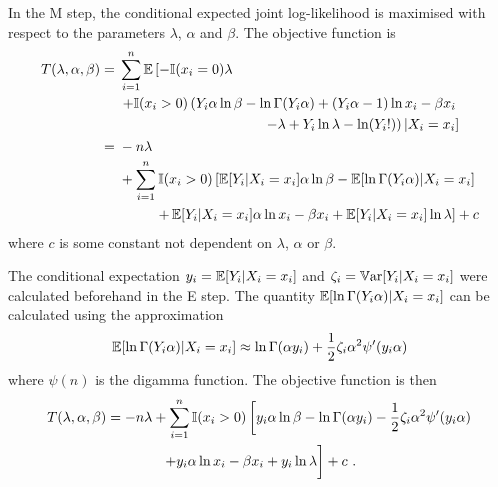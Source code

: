 In the M step, the conditional expected joint log-likelihood is maximised with respect to the parameters $\lambda$, $\alpha$ and $\beta$. The objective function is
\begin{align}
  T(\lambda,\alpha,\beta)&=
  \begin{multlined}[t]
    \sum_{i=1}^n
    \expectation\left[
      -\mathbb{I}(x_i=0)
      \lambda
    \right.
    \\
    \left.+
      \mathbb{I}(x_i>0)
      \left(
        Y_i\alpha\ln\beta-\ln\Gamma(Y_i\alpha)+(Y_i\alpha-1)\ln x_i - \beta x_i
      \right.
    \right.
    \\
    \left.
      \left.  
        - \lambda + Y_i \ln \lambda - \ln(Y_i!)
      \right)
      |X_i=x_i
    \right]
  \end{multlined}
  \nonumber\\
  &=\begin{multlined}[t]
    -n\lambda
    \\
    +\sum_{i=1}^n
    \mathbb{I}(x_i>0)
    \left[
      \expectation[Y_i|X_i=x_i]\alpha\ln\beta-\expectation[\ln\Gamma(Y_i\alpha)|X_i=x_i]
    \right.
    {}\\
    \left.
      +\expectation[Y_i|X_i=x_i]\alpha\ln x_i - \beta x_i
      + \expectation[Y_i|X_i=x_i] \ln \lambda
    \right] + c
  \end{multlined}
\end{align}
where $c$ is some constant not dependent on $\lambda$, $\alpha$ or $\beta$.

The conditional expectation $y_i = \operatorname{\mathbb{E}}[Y_i|X_i=x_i]$ and $\zeta_i = \operatorname{\mathbb{V}ar}[Y_i|X_i=x_i]$ were calculated beforehand in the E step. The quantity $\operatorname{\mathbb{E}}[\ln\Gamma(Y_i\alpha)|X_i=x_i]$ can be calculated using the approximation
\begin{equation}
  \operatorname{\mathbb{E}}[\ln\Gamma(Y_i\alpha)|X_i=x_i] \approx
  \ln\Gamma(\alpha y_i) + \frac{1}{2}\zeta_i\alpha^2\psi'(y_i\alpha)
\end{equation}
where $\psi(n)$ is the digamma function. The objective function is then
\begin{multline}
  T(\lambda,\alpha,\beta)=
  -n\lambda
  +\sum_{i=1}^n
  \mathbb{I}(x_i>0)
  \left[
    y_i\alpha\ln\beta-\ln\Gamma(\alpha y_i) - \frac{1}{2}\zeta_i\alpha^2\psi'(y_i\alpha)
  \right.
  \\
  \left.
    +y_i\alpha\ln x_i - \beta x_i
    + y_i \ln \lambda
    \vphantom{\frac{1}{1}}
  \right]
  + c
  \ .
\end{multline}

